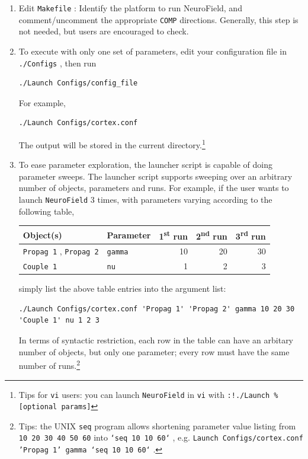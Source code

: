 \documentclass[12pt,a4paper]{article}
\newcommand{\type}[1]{ {\small\small\tt #1} }
\newcommand{\NF}[0]{ \type{NeuroField}}
\begin{document}
\begin{enumerate}

\item Edit \type{Makefile}: Identify the platform to run NeuroField, and comment/uncomment the appropriate \type{COMP} directions. Generally, this step is not needed, but users are encouraged to check.

\item To execute with only one set of parameters, edit your configuration file in \type{./Configs}, then run
\begin{lstlisting}
./Launch Configs/config_file
\end{lstlisting}
For example,
\begin{lstlisting}
./Launch Configs/cortex.conf
\end{lstlisting}
The output will be stored in the current directory.\footnote{Tips for \type{vi} users: you can launch \NF in \type{vi} with \type{:!./Launch \% [optional params]} }

\item To ease parameter exploration, the launcher script is capable of doing parameter sweeps. The launcher script supports sweeping over an arbitrary number of objects, parameters and runs. For example, if the user wants to launch \NF 3 times, with parameters varying according to the following table,

\begin{tabular}{l l r r r}
Object(s)&Parameter&1\textsuperscript{st} run&2\textsuperscript{nd} run&3\textsuperscript{rd} run\\
\hline
\type{Propag 1}, \type{Propag 2}&\type{gamma}&10&20&30\\
\type{Couple 1}&\type{nu}&1&2&3
\end{tabular}

simply list the above table entries into the argument list:
\begin{lstlisting}
./Launch Configs/cortex.conf 'Propag 1' 'Propag 2' gamma 10 20 30 'Couple 1' nu 1 2 3
\end{lstlisting}

In terms of syntactic restriction, each row in the table can have an arbitary number of objects, but only one parameter; every row must have the same number of runs.\footnote{Tips: the UNIX \type{seq} program allows shortening parameter value listing from \type{10 20 30 40 50 60} into \type{`seq 10 10 60`}, e.g. \type{Launch Configs/cortex.conf 'Propag 1' gamma `seq 10 10 60`}.}


\end{enumerate}
\end{document}
